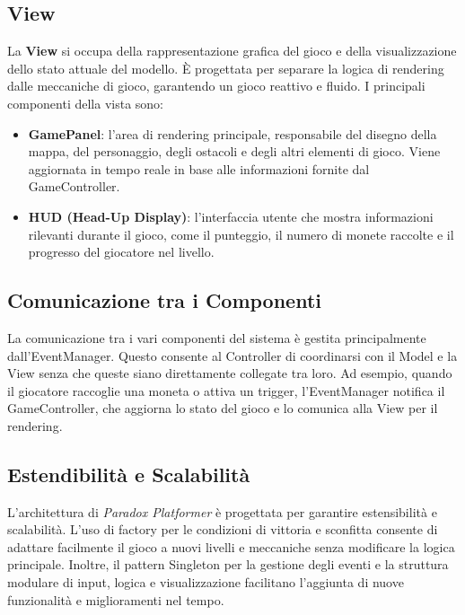 \documentclass[a4paper,12pt]{report}
\begin{document}
\subsection{View}

La \textbf{View} si occupa della rappresentazione grafica del gioco e della visualizzazione dello stato attuale del modello. È progettata per separare la logica di rendering dalle meccaniche di gioco, garantendo un gioco reattivo e fluido. I principali componenti della vista sono:

\begin{itemize} \item \textbf{GamePanel}: l’area di rendering principale, responsabile del disegno della mappa, del personaggio, degli ostacoli e degli altri elementi di gioco. Viene aggiornata in tempo reale in base alle informazioni fornite dal GameController. \item \textbf{HUD (Head-Up Display)}: l’interfaccia utente che mostra informazioni rilevanti durante il gioco, come il punteggio, il numero di monete raccolte e il progresso del giocatore nel livello. \end{itemize}

\subsection{Comunicazione tra i Componenti}

La comunicazione tra i vari componenti del sistema è gestita principalmente dall'EventManager. Questo consente al Controller di coordinarsi con il Model e la View senza che queste siano direttamente collegate tra loro. Ad esempio, quando il giocatore raccoglie una moneta o attiva un trigger, l'EventManager notifica il GameController, che aggiorna lo stato del gioco e lo comunica alla View per il rendering.

\subsection{Estendibilità e Scalabilità}

L'architettura di \textit{Paradox Platformer} è progettata per garantire estensibilità e scalabilità. L’uso di factory per le condizioni di vittoria e sconfitta consente di adattare facilmente il gioco a nuovi livelli e meccaniche senza modificare la logica principale. Inoltre, il pattern Singleton per la gestione degli eventi e la struttura modulare di input, logica e visualizzazione facilitano l'aggiunta di nuove funzionalità e miglioramenti nel tempo.
\end{document}
